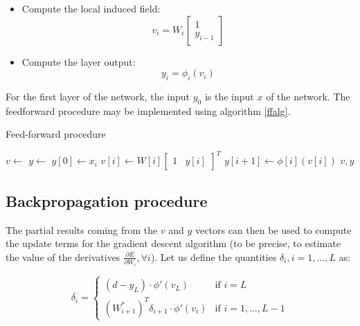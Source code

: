 \documentclass[letterpaper,headings=standardclasses]{scrartcl}
\begin{document}
\begin{itemize}
    \item Compute the local induced field:
    $$ v_i = W_i \left[ \begin{matrix} 1 \\ y_{i - 1} \end{matrix} \right] $$
    \item Compute the layer output:
    $$ y_i = \phi_i (v_i) $$
\end{itemize}

For the first layer of the network, the input $y_0$ is the input $x$ of the network. The feedforward procedure may be implemented using algorithm \ref{ffalg}.

\begin{algorithm}[h]
    \caption{Feed-forward procedure}
    \label{ffalg}
    \begin{algorithmic}
    
        \State {}
        \State $v \gets $ 
        \State $y \gets $ 
        \State $y[0] \gets x_i$
        \State {}
            \State $v[i] \gets W[i] \left[ \begin{matrix} 1 & y[i] \end{matrix} \right]^T$
            \State $y[i + 1] \gets \phi[i](v[i])$
        \EndFor
        \State \Return $v, y$
    \EndFunction
    
    \end{algorithmic}
\end{algorithm}

\subsection{Backpropagation procedure}

The partial results coming from the $v$ and $y$ vectors can then be used to compute the update terms for the gradient descent algorithm (to be precise, to estimate the value of the derivatives $\frac{\partial E}{\partial W_i}, \forall i$). Let us define the quantities $\delta_i, i = 1, \dots, L$ as:

$$ \delta_i = \begin{cases} (d - y_L) \cdot \phi'(v_L) & \text{if } i = L \\ \left( W^*_{i + 1} \right)^T \delta_{i + 1} \cdot \phi'(v_i) & \text{if } i = 1, \dots, L - 1 \end{cases} $$
\end{document}
